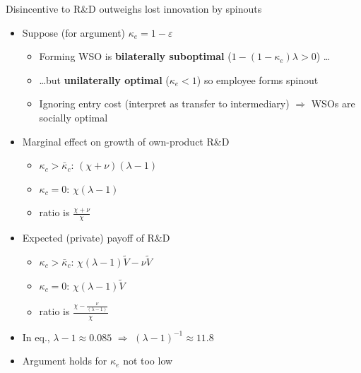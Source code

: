 \documentclass[english,usenames,dvipsnames]{beamer}
\begin{document}
\begin{frame}{Disincentive to R\&D outweighs lost innovation by spinouts}\label{disincentive_outweighs_main}
	\small
	\begin{itemize}
		\item<+-> Suppose (for argument) $\kappa_e = 1 - \varepsilon$
		\begin{itemize}
			\footnotesize
			\item<+-> Forming WSO is \alert{\textbf{bilaterally suboptimal}} ($1 - (1-\kappa_e)\lambda > 0$) \ldots
			\item<+-> \ldots but \alert{\textbf{unilaterally optimal}} ($\kappa_e < 1$) so employee forms spinout 
			\item<+-> Ignoring entry cost (interpret as transfer to intermediary) $\Rightarrow$ WSOs are socially optimal
		\end{itemize}
		\smallskip
		\item<+-> Marginal effect on growth of own-product R\&D
		\begin{itemize}
			\footnotesize
			\item<+-> $\kappa_c > \bar{\kappa}_c$: $(\chi + \nu)(\lambda -1)$
			\item<+-> $\kappa_c = 0$: $\chi (\lambda -1)$
			\item<+-> ratio is $\frac{\chi + \nu}{\chi}$
		\end{itemize}
		\smallskip
		\item<+-> Expected (private) payoff of R\&D
		\begin{itemize}
			\footnotesize
			\item<+-> $\kappa_c > \bar{\kappa}_c$: $\chi (\lambda - 1) \tilde{V} - \nu \tilde{V}$
			\item<+-> $\kappa_c = 0$: $\chi (\lambda -1) \tilde{V}$
			\item<+-> ratio is $\frac{\chi - \frac{\nu}{(\lambda -1)}}{\chi}$
		\end{itemize}
		\item<+-> In eq., $\lambda - 1 \approx 0.085$ $\Rightarrow$ $(\lambda -1)^{-1} \approx 11.8$
		\item<+-> Argument holds for $\kappa_e$ not too low \hyperlink{disincentive_outweighs_general}{}
	\end{itemize}
\end{frame}
\end{document}

